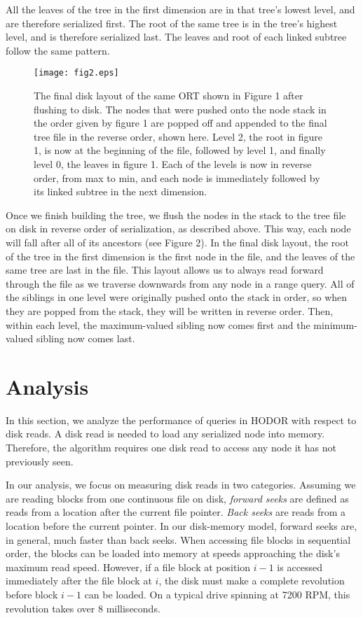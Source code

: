 \documentclass[11pt, oneside]{article}
\begin{document}
All the leaves of the tree in the first dimension are in that tree's lowest
level, and are therefore serialized first. The root of the same tree is in the
tree's highest level, and is therefore serialized last. The leaves and root of
each linked subtree follow the same pattern. 

\begin{figure}[h!]
    \centering
    \texttt{[image: fig2.eps]}
    \caption{
        The final disk layout of the same ORT shown in Figure 1 after flushing
        to disk. The nodes that were pushed onto the node stack in the order
        given by figure 1 are popped off and appended to the final tree file in
        the reverse order, shown here. Level 2, the root in figure 1, is now at
        the beginning of the file, followed by level 1, and finally level 0,
        the leaves in figure 1. Each of the levels is now in reverse order,
        from max to min, and each node is immediately followed by its linked
        subtree in the next dimension. 
    }
    \vspace{0.5in}
\end{figure}

Once we finish building the tree, we flush the nodes in the stack to the tree
file on disk in reverse order of serialization, as described above. This way,
each node will fall after all of its ancestors (see Figure 2). In the final disk
layout, the root of the tree in the first dimension is the first node in the
file, and the leaves of the same tree are last in the file. This layout allows
us to always read forward through the file as we traverse downwards from any
node in a range query. All of the siblings in one level were originally pushed
onto the stack in order, so when they are popped from the stack, they will be
written in reverse order. Then, within each level, the maximum-valued sibling
now comes first and the minimum-valued sibling now comes last. 

\section{Analysis}

In this section, we analyze the performance of queries in HODOR with respect to
disk reads. A disk read is needed to load any serialized node into memory.
Therefore, the algorithm requires one disk read to access any node it has not
previously seen.

In our analysis, we focus on measuring disk reads in two categories.  Assuming
we are reading blocks from one continuous file on disk, \textit{forward seeks}
are defined as reads from a location after the current file pointer.
\textit{Back seeks} are reads from a location before the current pointer. In our
disk-memory model, forward seeks are, in general, much faster than back seeks.
When accessing file blocks in sequential order, the blocks can be loaded into
memory at speeds approaching the disk's maximum read speed.  However, if a file
block at position $i-1$ is accessed immediately after the file block at $i$, the
disk must make a complete revolution before block $i-1$ can be loaded. On a
typical drive spinning at 7200 RPM, this revolution takes over 8 milliseconds.
\end{document}
